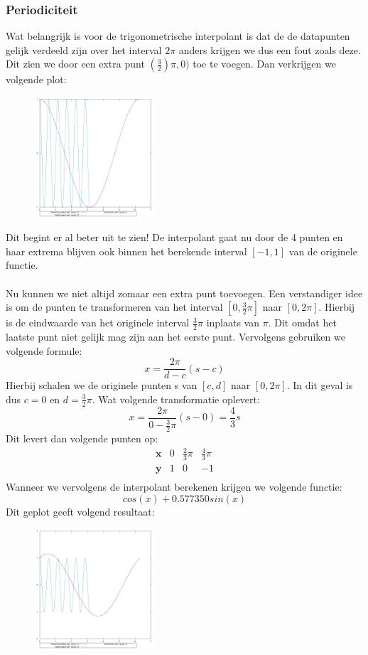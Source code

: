 \documentclass[10pt,a4paper,twocolumn]{article}
\begin{document}
\subsubsection{Periodiciteit}
Wat belangrijk is voor de trigonometrische interpolant is dat de de datapunten gelijk verdeeld zijn over het interval $2\pi$ anders krijgen we dus een fout zoals deze. Dit zien we door een extra punt $(\frac{3}{2})\pi, 0)$ toe te voegen. Dan verkrijgen we volgende plot:
\begin{figure}[H]
\includegraphics[width=0.4\textwidth]{combined-4}
\end{figure}
Dit begint er al beter uit te zien! De interpolant gaat nu door de 4 punten en haar extrema blijven ook binnen het berekende interval $[-1, 1]$ van de originele functie.
\\
\\
Nu kunnen we niet altijd zomaar een extra punt toevoegen. Een verstandiger idee is om de punten te transformeren van het interval $[0,\frac{3}{2}\pi]$ naar $[0, 2\pi]$. Hierbij is de eindwaarde van het originele interval $\frac{3}{2} \pi$ inplaats van $\pi$. Dit omdat het laatste punt niet gelijk mag zijn aan het eerste punt. Vervolgens gebruiken we volgende formule:
$$x = \frac{2 \pi}{d-c}(s-c)$$
Hierbij schalen we de originele punten s van $[c, d]$ naar $[0, 2\pi]$. In dit geval is dus $c = 0$ en $d = \frac{3}{2}\pi$. Wat volgende transformatie oplevert:
$$ x = \frac{2\pi}{0-\frac{3}{2}\pi}(s-0) = \frac{4}{3}s$$
Dit levert dan volgende punten op:
$$
\begin{matrix}
\textbf{x} & 0 & \frac{2}{3} \pi & \frac{4}{3}\pi \\
\textbf{y} & 1 & 0 & -1 \\
\end{matrix}
$$
Wanneer we vervolgens de interpolant berekenen krijgen we volgende functie:
$$cos(x) + 0.577350sin(x)$$
Dit geplot geeft volgend resultaat:
\begin{figure}[H]
\includegraphics[width=0.4\textwidth]{combined-transformed}
\end{figure}
\end{document}

